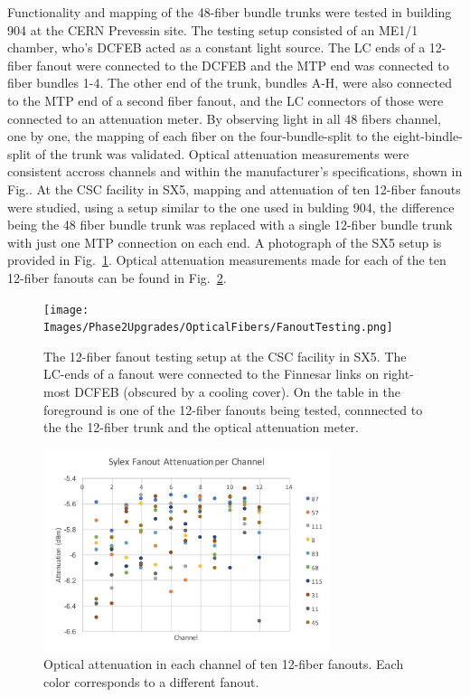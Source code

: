 Functionality and mapping of the 48-fiber bundle trunks were tested in building 904 at the CERN Prevessin site. The testing setup consisted of an ME1/1 chamber, who's DCFEB acted as a constant light source. The LC ends of a 12-fiber fanout were connected to the DCFEB and the MTP end was connected to fiber bundles 1-4. The other end of the trunk, bundles A-H, were also connected to the MTP end of a second fiber fanout, and the LC connectors of those were connected to an attenuation meter. By observing light in all 48 fibers channel, one by one, the mapping of each fiber on the four-bundle-split to the eight-bindle-split of the trunk was validated. Optical attenuation measurements were consistent accross channels and within the manufacturer's specifications, shown in Fig.. At the CSC facility in SX5, mapping and attenuation of ten 12-fiber fanouts were studied, using a setup similar to the one used in bulding 904, the difference being the 48 fiber bundle trunk was replaced with a single 12-fiber bundle trunk with just one MTP connection on each end. A photograph of the SX5 setup is provided in Fig.~\ref{fig:fibertestsetup}. Optical attenuation measurements made for each of the ten 12-fiber fanouts can be found in Fig.~\ref{fig:fanoutattenuation}.

\begin{figure}[H]
    \centering
    \texttt{[image: Images/Phase2Upgrades/OpticalFibers/FanoutTesting.png]}
    \caption{The 12-fiber fanout testing setup at the CSC facility in SX5. The LC-ends of a fanout were connected to the Finnesar links on right-most DCFEB (obscured by a cooling cover). On the table in the foreground is one of the 12-fiber fanouts being tested, connnected to the the 12-fiber trunk and the optical attenuation meter.}
    \label{fig:fibertestsetup}
\end{figure}

\begin{figure}[H]
    \centering
    \includegraphics[width=0.75\textwidth]{Images/Phase2Upgrades/OpticalFibers/FanoutAttenuation.png}
    \caption{Optical attenuation in each channel of ten 12-fiber fanouts. Each color corresponds to a different fanout.}
    \label{fig:fanoutattenuation}
\end{figure}

